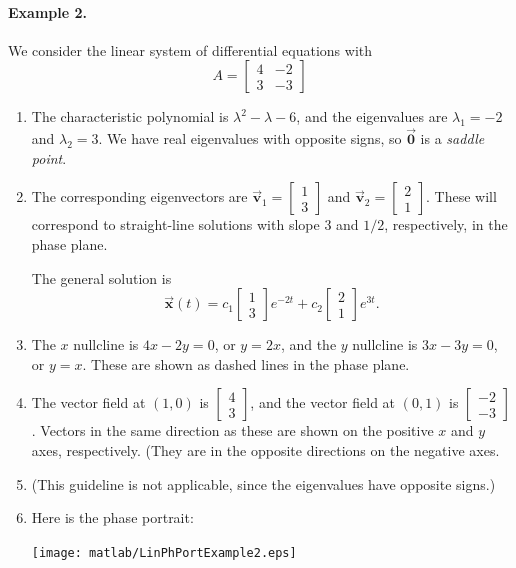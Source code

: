 \documentclass[reqno]{immbook}
\newcommand{\BV}{\vec{\textbf{v}}}
\newcommand{\BX}{\vec{\textbf{x}}}
\newcommand{\BZ}{\vec{\textbf{0}}}  %
\begin{document}
\paragraph{Example 2.}
We consider the linear system of differential equations
with
\[
   A = \begin{bmatrix}
            4 & -2 \\ 3 & -3
       \end{bmatrix}
\]
\begin{enumerate}
\item
The characteristic polynomial is
$\lambda^2 -\lambda -6$, and the eigenvalues are
$\lambda_1 = -2$ and $\lambda_2 = 3$.
We have real eigenvalues with opposite signs, so
$\BZ$ is a \emph{saddle point}.
\item
The corresponding eigenvectors are
$\BV_1 = \begin{bmatrix} 1 \\ 3 \end{bmatrix}$
and
$\BV_2 = \begin{bmatrix} 2 \\ 1 \end{bmatrix}$.
These will correspond to straight-line solutions with
slope $3$ and $1/2$, respectively, in the phase plane.

The general solution is
\begin{equation}
\BX(t) = c_1 \begin{bmatrix} 1 \\ 3 \end{bmatrix} e^{-2t}
   + c_2 \begin{bmatrix} 2 \\ 1 \end{bmatrix} e^{3t}.
\end{equation}
\item
The $x$ nullcline is $4x-2y=0$, or $y = 2x$, and the
$y$ nullcline is $3x-3y=0$, or $y=x$.  These are shown
as dashed lines in the phase plane.
\item
The vector field at $(1,0)$ is $\begin{bmatrix} 4 \\ 3 \end{bmatrix}$,
and the vector field at $(0,1)$
is $\begin{bmatrix} -2 \\ -3 \end{bmatrix}$.  Vectors in the
same direction as these are shown on the positive $x$ and $y$ axes,
respectively.
(They are in the opposite directions on the negative axes.
\item
(This guideline is not applicable, since the eigenvalues
have opposite signs.)
\item
Here is the phase portrait:

\noindent
\centerline{\texttt{[image: matlab/LinPhPortExample2.eps]}}
\end{enumerate}
\end{document}
